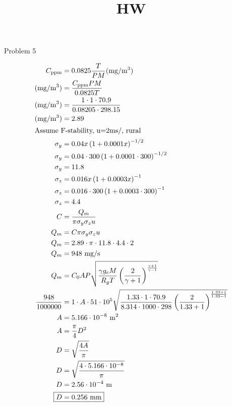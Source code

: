 \documentclass[12pt]{article}
\title{HW}
\date{}
\begin{document}

Problem 5
    
\begin{align*}
    C_{\text{ppm}} &= 0.0825 \frac{T}{PM} \text{(mg/m$^3$)} \\
    \text{(mg/m$^3$)} &= \frac{C_{\text{ppm}}PM}{0.0825T} \\
    \text{(mg/m$^3$)} &= \frac{1 \cdot 1 \cdot 70.9}{0.08205 \cdot 298.15} \\
    \text{(mg/m$^3$)} &= 2.89 \\ 
    \intertext{Assume F-stability, u=2ms/, rural}
    \sigma_y &= 0.04x\left(1+0.0001x\right)^{-1/2} \\
    \sigma_y &= 0.04\cdot300\left(1+0.0001\cdot300\right)^{-1/2} \\
    \sigma_y &= 11.8 \\
    \sigma_z &= 0.016x\left(1+0.0003x\right)^{-1} \\
    \sigma_z &= 0.016\cdot300\left(1+0.0003\cdot300\right)^{-1} \\
    \sigma_z &= 4.4 \\
    C &= \frac{Q_m}{\pi\sigma_y\sigma_zu} \\
    Q_m &= C\pi\sigma_y\sigma_zu \\
    Q_m &= 2.89 \cdot \pi \cdot 11.8 \cdot 4.4 \cdot 2 \\
    Q_m &= 948 \text{ mg/s} \\
    Q_m &= C_0 AP \sqrt{\frac{\gamma g_c M}{R_gT}\left(\frac{2}{\gamma+1}\right)^{\frac{\gamma+1}{\gamma-1}}} \\
    \frac{948}{1000000} &= 1 \cdot A \cdot 51\cdot10^5 \sqrt{\frac{1.33\cdot1\cdot70.9}{8.314\cdot1000\cdot298}\left(\frac{2}{1.33+1}\right)^{\frac{1.33+1}{1.33-1}}} \\
    A &= 5.166 \cdot 10^{-8} \text{ m$^2$} \\
    A &= \frac{\pi}{4} D^2 \\
    D &= \sqrt{\frac{4A}{\pi}} \\
    D &= \sqrt{\frac{4\cdot5.166 \cdot 10^{-8}}{\pi}} \\
    D &= 2.56\cdot 10^{-4} \text{ m} \\
    \Aboxed{D &= 0.256 \text{ mm}}
\end{align*}
\end{document}
